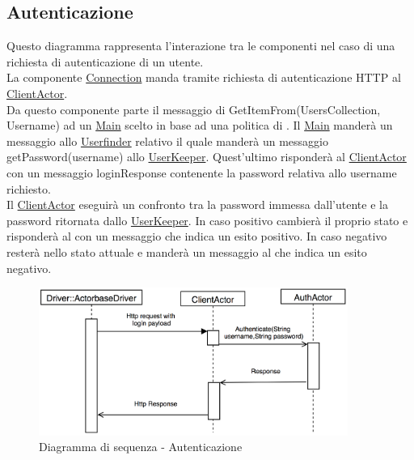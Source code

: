 \documentclass{scalatekids-article}
\begin{document}
\subsection{Autenticazione}

Questo diagramma rappresenta l'interazione tra le componenti nel caso di una richiesta di autenticazione di un utente.\\
La componente \hyperref[sec:actorbase::driver::client::Connection]{Connection}
manda tramite richiesta di autenticazione HTTP al \hyperref[sec:actorbase::actorsystem::actors::clientactor::ClientActor]{ClientActor}.\\
Da questo componente parte il messaggio di GetItemFrom(UsersCollection, Username) ad un \hyperref[sec:actorbase::actorsystem::actors::main::Main]{Main}
scelto in base ad una politica di .
Il \hyperref[sec:actorbase::actorsystem::actors::main::Main]{Main} manderà un messaggio allo \hyperref[sec:actorbase::actorsystem::actors::userfinder::Userfinder]{Userfinder}
relativo il quale manderà un messaggio getPassword(username) allo \hyperref[sec:actorbase::actorsystem::actors::userkeeper::UserKeeper]{UserKeeper}.
Quest'ultimo risponderà al \hyperref[sec:actorbase::actorsystem::actors::clientactor::ClientActor]{ClientActor} con un messaggio
loginResponse contenente la password relativa allo username richiesto.\\
Il \hyperref[sec:actorbase::actorsystem::actors::clientactor::ClientActor]{ClientActor} eseguirà un confronto tra la password immessa dall'utente
e la password ritornata dallo \hyperref[sec:actorbase::actorsystem::actors::userkeeper::UserKeeper]{UserKeeper}.
In caso positivo cambierà il proprio stato e risponderà al  con un messaggio che indica un esito positivo.
In caso negativo resterà nello stato attuale e manderà un messaggio al  che indica un esito negativo.
\begin{figure}[H]
  \begin{center}
    \includegraphics[width=0.9\textwidth, keepaspectratio]{img/diagrammiSequenza/esempioAuth.png}
    \caption{Diagramma di sequenza - Autenticazione}
  \end{center}
\end{figure}
\end{document}
